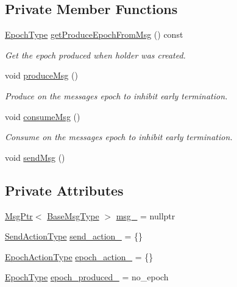 \subsection*{Private Member Functions}
\begin{DoxyCompactItemize}
\item 
\hyperlink{namespacevt_a81d11b28122d43bf9834577e4a06440f}{Epoch\+Type} \hyperlink{structvt_1_1messaging_1_1_pending_send_a8293dffe4d8cdc81de573d2edf0ee4cb}{get\+Produce\+Epoch\+From\+Msg} () const
\begin{DoxyCompactList}\small\item\em Get the epoch produced when holder was created. \end{DoxyCompactList}\item 
void \hyperlink{structvt_1_1messaging_1_1_pending_send_af5961bb21b4a427732be91ac699d570b}{produce\+Msg} ()
\begin{DoxyCompactList}\small\item\em Produce on the messages epoch to inhibit early termination. \end{DoxyCompactList}\item 
void \hyperlink{structvt_1_1messaging_1_1_pending_send_a0f249a127a798ba0823fae82c925ed3b}{consume\+Msg} ()
\begin{DoxyCompactList}\small\item\em Consume on the messages epoch to inhibit early termination. \end{DoxyCompactList}\item 
void \hyperlink{structvt_1_1messaging_1_1_pending_send_a93da625c74a5d35ca0b7dec3fad86152}{send\+Msg} ()
\end{DoxyCompactItemize}
\subsection*{Private Attributes}
\begin{DoxyCompactItemize}
\item 
\hyperlink{namespacevt_a9f5ebd62ee9d6dd8829e3e1cc4f858e9}{Msg\+Ptr}$<$ \hyperlink{namespacevt_a44d0d4e144748f2b19a1cfd962f50338}{Base\+Msg\+Type} $>$ \hyperlink{structvt_1_1messaging_1_1_pending_send_a6202f4243176b9189d9aef17aa108a36}{msg\+\_\+} = nullptr
\item 
\hyperlink{structvt_1_1messaging_1_1_pending_send_aa13248a342d68230048cde8e0756851c}{Send\+Action\+Type} \hyperlink{structvt_1_1messaging_1_1_pending_send_a0054d2fec8353438284dc02a28a73294}{send\+\_\+action\+\_\+} = \{\}
\item 
\hyperlink{structvt_1_1messaging_1_1_pending_send_a25131dc5a5e003dc65187edc97c23d1c}{Epoch\+Action\+Type} \hyperlink{structvt_1_1messaging_1_1_pending_send_a6b53bdc8c1eb674e724fd71bd1065034}{epoch\+\_\+action\+\_\+} = \{\}
\item 
\hyperlink{namespacevt_a81d11b28122d43bf9834577e4a06440f}{Epoch\+Type} \hyperlink{structvt_1_1messaging_1_1_pending_send_a77a8ad56dc73c0821c3fa4cef0b4c27a}{epoch\+\_\+produced\+\_\+} = no\+\_\+epoch
\end{DoxyCompactItemize}


